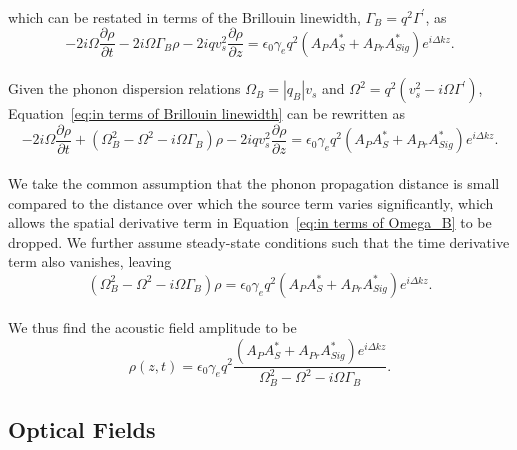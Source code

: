 \\
which can be restated in terms of the Brillouin linewidth, \(\Gamma_{B} = q^{2}\Gamma^{\prime}\), as
\\
\begin{equation}
    -2i\Omega\frac{\partial\rho}{\partial t} - 2i\Omega\Gamma_{B}\rho - 2iqv_{s}^{2}\frac{\partial\rho}{\partial z} = \epsilon_{0}\gamma_{e}q^{2}(A_{P}A_{S}^{*} + A_{Pr}A_{Sig}^{*})e^{i\Delta kz}.
    \label{eq:in terms of Brillouin linewidth}
\end{equation}
\\
Given the phonon dispersion relations \(\Omega_{B} = |q_{B}|v_{s}\) and \(\Omega^{2} = q^{2}\left(v_{s}^{2} - i\Omega\Gamma^{\prime}\right)\), Equation~\ref{eq:in terms of Brillouin linewidth} can be rewritten as
\\
\begin{equation}
    -2i\Omega\frac{\partial\rho}{\partial t} + \left(\Omega_{B}^{2} - \Omega^{2} - i\Omega\Gamma_{B}\right)\rho - 2iqv_{s}^{2}\frac{\partial\rho}{\partial z} = \epsilon_{0}\gamma_{e}q^{2}(A_{P}A_{S}^{*} + A_{Pr}A_{Sig}^{*})e^{i\Delta kz}.
    \label{eq:in terms of Omega_B}
\end{equation}
\\
We take the common assumption that the phonon propagation distance is small compared to the distance over which the source term varies significantly, which allows the spatial derivative term in Equation~\ref{eq:in terms of Omega_B} to be dropped. We further assume steady-state conditions such that the time derivative term also vanishes, leaving
\\
\begin{equation}
    (\Omega^{2}_{B} - \Omega^{2} - i\Omega\Gamma_{B})\rho = \epsilon_{0}\gamma_{e}q^{2}(A_{P}A_{S}^{*} + A_{Pr}A_{Sig}^{*})e^{i\Delta kz}.
\end{equation}
\\
We thus find the acoustic field amplitude to be
\\
\begin{equation}
    \rho(z,t) = \epsilon_{0}\gamma_{e}q^{2}\frac{(A_{P}A_{S}^{*} + A_{Pr}A_{Sig}^{*})e^{i\Delta kz}}{\Omega_{B}^{2} - \Omega^{2} - i\Omega\Gamma_{B}}.
    \label{eq:Acoustic field amplitude}
\end{equation}


\subsection{Optical Fields}
\label{Coupled-Wave Equations:Optical Fields}

